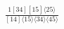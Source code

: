 \documentclass[varwidth, border=5pt]{standalone}
\begin{document}
\begin{my}
$\begin{gathered}
\scriptscriptstyle\frac{1[34][15]⟨25⟩}{[14]⟨15⟩⟨34⟩⟨45⟩}
\end{gathered}$
\end{my}
\end{document}
